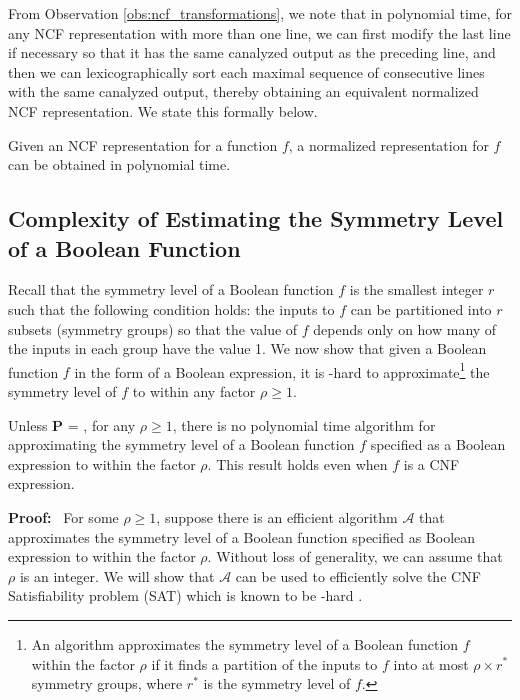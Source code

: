 \medskip
From Observation \ref{obs:ncf_transformations},
we note that in polynomial time, for any NCF representation with more than one line,
we can first modify the last line if necessary so that it has the same canalyzed output as the preceding line,
and then we can lexicographically sort
each maximal sequence of consecutive lines with the same canalyzed output,
thereby obtaining an equivalent normalized NCF representation.
We state this formally below.

\begin{observation}\label{obs:normalization_poly}
Given an NCF representation for a function $f$, a normalized
representation for $f$ can be obtained in polynomial time. \QED
\end{observation}

\subsection{Complexity of Estimating the Symmetry Level of a 
Boolean Function}
\label{sse:symmetry_level_hardness}

Recall that the symmetry level of a Boolean function $f$ is the smallest
integer $r$ such that the following condition holds:
the  inputs to $f$ can be partitioned into $r$ subsets 
(symmetry groups) so that the value of $f$ depends only on 
how many of the inputs in each group have the value 1.
We now show that given a Boolean function $f$
in the form of a Boolean expression, it is \cnp-hard to 
approximate\footnote{An algorithm approximates the symmetry
level of a Boolean function $f$ within the factor $\rho$ if it finds a
partition of the inputs to $f$ into at most $\rho \times r^*$ symmetry
groups, where $r^*$ is the symmetry level of $f$.}
the symmetry level of $f$ to within any factor $\rho \geq 1$.

\newcommand{\cala}{\mbox{$\mathcal{A}$}}

\begin{theorem}\label{thm:approx_sym_level_hard}
Unless \textbf{P} = \cnp,
for any $\rho \geq 1$, there is no polynomial time 
algorithm for approximating the 
symmetry level of a Boolean function $f$ 
specified as a Boolean expression to within the factor $\rho$.
This result holds even when $f$ is a CNF expression.
\end{theorem}

\noindent
\textbf{Proof:}~ For some $\rho \geq 1$, suppose there is an efficient algorithm \cala{} 
that approximates the symmetry level of a Boolean function
specified as Boolean expression to within the factor $\rho$.
Without loss of generality, we can assume that $\rho$ is an integer.
We will show that \cala{} can be used to efficiently solve
the CNF Satisfiability problem (SAT) which is known 
to be \cnp-hard \cite{GJ-1979}.

